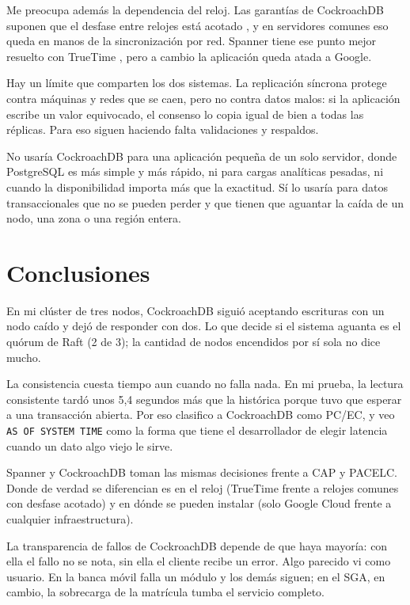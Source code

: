 \documentclass[12pt,a4paper]{article}
\begin{document}
Me preocupa además la dependencia del reloj. Las garantías de CockroachDB suponen que el desfase entre relojes está acotado \cite{ajmani2022demo}, y en servidores comunes eso queda en manos de la sincronización por red. Spanner tiene ese punto mejor resuelto con TrueTime \cite{song2025k2}, pero a cambio la aplicación queda atada a Google.

Hay un límite que comparten los dos sistemas. La replicación síncrona protege contra máquinas y redes que se caen, pero no contra datos malos: si la aplicación escribe un valor equivocado, el consenso lo copia igual de bien a todas las réplicas. Para eso siguen haciendo falta validaciones y respaldos.

No usaría CockroachDB para una aplicación pequeña de un solo servidor, donde PostgreSQL es más simple y más rápido, ni para cargas analíticas pesadas, ni cuando la disponibilidad importa más que la exactitud. Sí lo usaría para datos transaccionales que no se pueden perder y que tienen que aguantar la caída de un nodo, una zona o una región entera.

\section{Conclusiones}

En mi clúster de tres nodos, CockroachDB siguió aceptando escrituras con un nodo caído y dejó de responder con dos. Lo que decide si el sistema aguanta es el quórum de Raft (2 de 3); la cantidad de nodos encendidos por sí sola no dice mucho.

La consistencia cuesta tiempo aun cuando no falla nada. En mi prueba, la lectura consistente tardó unos 5,4 segundos más que la histórica porque tuvo que esperar a una transacción abierta. Por eso clasifico a CockroachDB como PC/EC, y veo \texttt{AS OF SYSTEM TIME} como la forma que tiene el desarrollador de elegir latencia cuando un dato algo viejo le sirve.

Spanner y CockroachDB toman las mismas decisiones frente a CAP y PACELC. Donde de verdad se diferencian es en el reloj (TrueTime frente a relojes comunes con desfase acotado) y en dónde se pueden instalar (solo Google Cloud frente a cualquier infraestructura).

La transparencia de fallos de CockroachDB depende de que haya mayoría: con ella el fallo no se nota, sin ella el cliente recibe un error. Algo parecido vi como usuario. En la banca móvil falla un módulo y los demás siguen; en el SGA, en cambio, la sobrecarga de la matrícula tumba el servicio completo.
\end{document}
